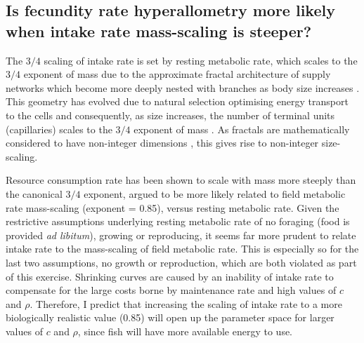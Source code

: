 \documentclass[a4paper]{article} %
\begin{document}
\subsection{Is fecundity rate hyperallometry more likely when intake rate mass-scaling is steeper?}

The $3/4$ scaling of intake rate is set by resting metabolic rate, which scales to the $3/4$ exponent of mass \autocite{Kleiber1947, peters1983, niklas1994plant} due to the approximate fractal architecture of supply networks which become more deeply nested with branches as body size increases \autocite{West1997}. This geometry has evolved due to natural selection optimising energy transport to the cells and consequently, as size increases, the number of terminal units (capillaries) scales to the $3/4$ exponent of mass \autocite{West1997, West2005}. As fractals are mathematically considered to have non-integer dimensions \autocite{Hausdorff1918, Mandelbrot1982}, this gives rise to non-integer size-scaling. 

Resource consumption rate has been shown to scale with mass more steeply than the canonical $3/4$ exponent, argued to be more likely related to field metabolic rate mass-scaling (exponent = 0.85), versus resting metabolic rate. Given the restrictive assumptions underlying resting metabolic rate of no foraging (food is provided \textit{ad libitum}), growing or reproducing, it seems far more prudent to relate intake rate to the mass-scaling of field metabolic rate. This is especially so for the last two assumptions, no growth or reproduction, which are both violated as part of this exercise. Shrinking curves are caused by an inability of intake rate to compensate for the large costs borne by maintenance rate and high values of $c$ and $\rho$. Therefore, I predict that increasing the scaling of intake rate to a more biologically realistic value (0.85) will open up the parameter space for larger values of $c$ and $\rho$, since fish will have more available energy to use.

\end{document}
